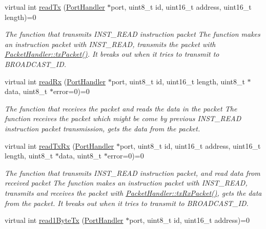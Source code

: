 \begin{DoxyCompactItemize}
virtual int \hyperlink{classmercury_1_1_packet_handler_a58220a79dcdff959241bd5688e6dbb1a}{read\+Tx} (\hyperlink{classmercury_1_1_port_handler}{Port\+Handler} $\ast$port, uint8\+\_\+t id, uint16\+\_\+t address, uint16\+\_\+t length)=0
\begin{DoxyCompactList}\small\item\em The function that transmits I\+N\+S\+T\+\_\+\+R\+E\+AD instruction packet  The function makes an instruction packet with I\+N\+S\+T\+\_\+\+R\+E\+AD,  transmits the packet with \hyperlink{classmercury_1_1_packet_handler_acc3f84f0d952dc2d827d8500de512abe}{Packet\+Handler\+::tx\+Packet()}.  It breaks out  when it tries to transmit to B\+R\+O\+A\+D\+C\+A\+S\+T\+\_\+\+ID. \end{DoxyCompactList}\item 
virtual int \hyperlink{classmercury_1_1_packet_handler_a0857bd487c48ea83fc2b93e1e3e80200}{read\+Rx} (\hyperlink{classmercury_1_1_port_handler}{Port\+Handler} $\ast$port, uint8\+\_\+t id, uint16\+\_\+t length, uint8\+\_\+t $\ast$data, uint8\+\_\+t $\ast$error=0)=0
\begin{DoxyCompactList}\small\item\em The function that receives the packet and reads the data in the packet  The function receives the packet which might be come by previous I\+N\+S\+T\+\_\+\+R\+E\+AD instruction packet transmission,  gets the data from the packet. \end{DoxyCompactList}\item 
virtual int \hyperlink{classmercury_1_1_packet_handler_ac743a57bba9e71aadb1578f0e704f166}{read\+Tx\+Rx} (\hyperlink{classmercury_1_1_port_handler}{Port\+Handler} $\ast$port, uint8\+\_\+t id, uint16\+\_\+t address, uint16\+\_\+t length, uint8\+\_\+t $\ast$data, uint8\+\_\+t $\ast$error=0)=0
\begin{DoxyCompactList}\small\item\em The function that transmits I\+N\+S\+T\+\_\+\+R\+E\+AD instruction packet, and read data from received packet  The function makes an instruction packet with I\+N\+S\+T\+\_\+\+R\+E\+AD,  transmits and receives the packet with \hyperlink{classmercury_1_1_packet_handler_ac7ceeaec210827d119199144badaad3a}{Packet\+Handler\+::tx\+Rx\+Packet()},  gets the data from the packet.  It breaks out  when it tries to transmit to B\+R\+O\+A\+D\+C\+A\+S\+T\+\_\+\+ID. \end{DoxyCompactList}\item 
virtual int \hyperlink{classmercury_1_1_packet_handler_a2da3f399926be08a5a436e3eaefd0766}{read1\+Byte\+Tx} (\hyperlink{classmercury_1_1_port_handler}{Port\+Handler} $\ast$port, uint8\+\_\+t id, uint16\+\_\+t address)=0

\end{DoxyCompactItemize}
